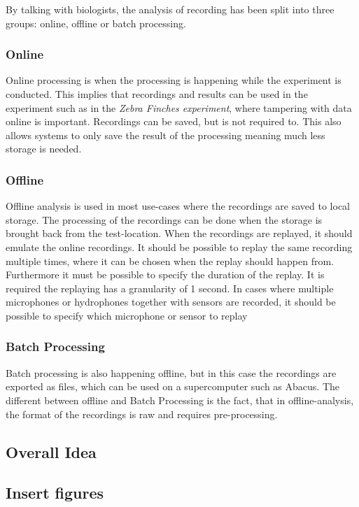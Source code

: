 By talking with biologists, the analysis of recording has been split into three groups: online, offline or batch processing.
\subsubsection{Online}\label{sec:usecase:online}
Online processing is when the processing is happening while the experiment is conducted. This implies that recordings and results can be used in the experiment such as in the \textit{Zebra Finches experiment}, where tampering with data online is important. Recordings can be saved, but is not required to. This also allows systems to only save the result of the processing meaning much less storage is needed.

\subsubsection{Offline}
Offline analysis is used in most use-cases where the recordings are saved to local storage. The processing of the recordings can be done when the storage is brought back from the test-location. When the recordings are replayed, it should emulate the online recordings.
It should be possible to replay the same recording multiple times, where it can be chosen when the replay should happen from. Furthermore it must be possible to specify the duration of the replay. It is required the replaying has a granularity of 1 second. In cases where multiple microphones or hydrophones together with sensors are recorded, it should be possible to specify which microphone or sensor to replay

\subsubsection{Batch Processing}
Batch processing is also happening offline, but in this case the recordings are exported as  files, which can be used on a supercomputer such as Abacus. The different between offline and Batch Processing is the fact, that in offline-analysis, the format of the recordings is raw and requires pre-processing.

\subsection{Overall Idea}
\subsection{Insert figures}



